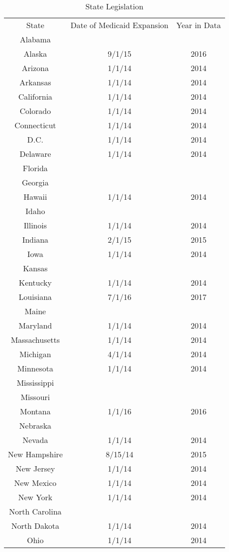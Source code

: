 \documentclass[11pt]{article}
\begin{document}
\begin{table}
\centering
\scriptsize
\caption{State Legislation} 
\label{State Legislation}
\begin{tabular}{ccc}
\hline \hline
 State & Date of Medicaid Expansion & Year in Data\\
 Alabama & &\\
 Alaska & 9/1/15 & 2016\\
 Arizona &1/1/14 & 2014\\
 Arkansas &1/1/14 & 2014\\
 California & 1/1/14 & 2014\\
 Colorado &1/1/14 & 2014\\
 Connecticut &1/1/14 & 2014\\
 D.C. &1/1/14 & 2014\\
 Delaware &1/1/14 & 2014\\
 Florida & &\\
 Georgia &&\\
 Hawaii &1/1/14 & 2014\\
 Idaho &&\\
 Illinois & 1/1/14 & 2014\\
 Indiana & 2/1/15 & 2015\\
 Iowa & 1/1/14 & 2014\\
 Kansas &&\\
 Kentucky & 1/1/14 & 2014\\
 Louisiana & 7/1/16 & 2017\\
 Maine &&\\
 Maryland & 1/1/14 & 2014\\
 Massachusetts & 1/1/14 & 2014\\
 Michigan & 4/1/14 &2014\\
 Minnesota & 1/1/14 & 2014\\
 Mississippi &&\\
 Missouri &&\\
 Montana & 1/1/16 & 2016\\
 Nebraska &&\\
 Nevada & 1/1/14 & 2014\\
 New Hampshire & 8/15/14 & 2015\\
 New Jersey & 1/1/14 & 2014\\
 New Mexico & 1/1/14 & 2014\\
 New York & 1/1/14 & 2014\\
 North Carolina &&\\
 North Dakota & 1/1/14 & 2014\\
 Ohio & 1/1/14 & 2014\\

\end{tabular}
\end{table}
\end{document}
